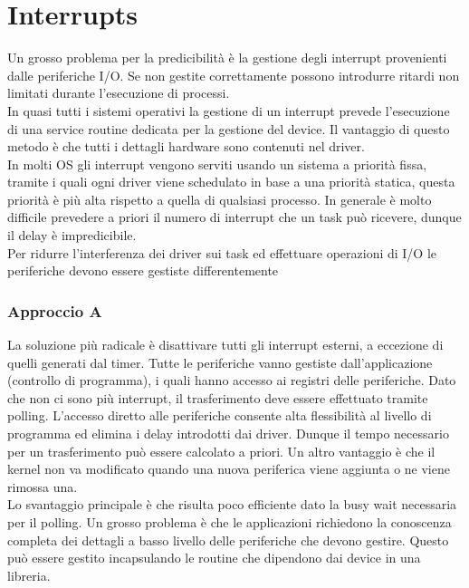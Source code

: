 \documentclass[12pt,openany,onesided]{book}
\begin{document}
\section{Interrupts}
Un grosso problema per la predicibilità è la gestione degli interrupt provenienti dalle periferiche I/O.
Se non gestite correttamente possono introdurre ritardi non limitati durante l'esecuzione di processi.\\
In quasi tutti i sistemi operativi la gestione di un interrupt prevede l'esecuzione di una service routine dedicata per la gestione del device.
Il vantaggio di questo metodo è che tutti i dettagli hardware sono contenuti nel driver.\\
In molti OS gli interrupt vengono serviti usando un sistema a priorità fissa, tramite i quali ogni driver viene schedulato in base a una priorità statica, questa priorità è più alta rispetto a quella di qualsiasi processo.
In generale è molto difficile prevedere a priori il numero di interrupt che un task può ricevere, dunque il delay è impredicibile.
\\
Per ridurre l'interferenza dei driver sui task ed effettuare operazioni di I/O le periferiche devono essere gestiste differentemente
\subsubsection{Approccio A}
La soluzione più radicale è disattivare tutti gli interrupt esterni, a eccezione di quelli generati dal timer.
Tutte le periferiche vanno gestiste dall'applicazione (controllo di programma), i quali hanno accesso ai registri delle periferiche.
Dato che non ci sono più interrupt, il trasferimento deve essere effettuato tramite polling.
L'accesso diretto alle periferiche consente alta flessibilità al livello di programma ed elimina i delay introdotti dai driver.
Dunque il tempo necessario per un trasferimento può essere calcolato a priori.
Un altro vantaggio è che il kernel non va modificato quando una nuova periferica viene aggiunta o ne viene rimossa una.
\\
Lo svantaggio principale è che risulta poco efficiente dato la busy wait necessaria per il polling.
Un grosso problema è che le applicazioni richiedono la conoscenza completa dei dettagli a basso livello delle periferiche che devono gestire.
Questo può essere gestito incapsulando le routine che dipendono dai device in una libreria.
\end{document}
